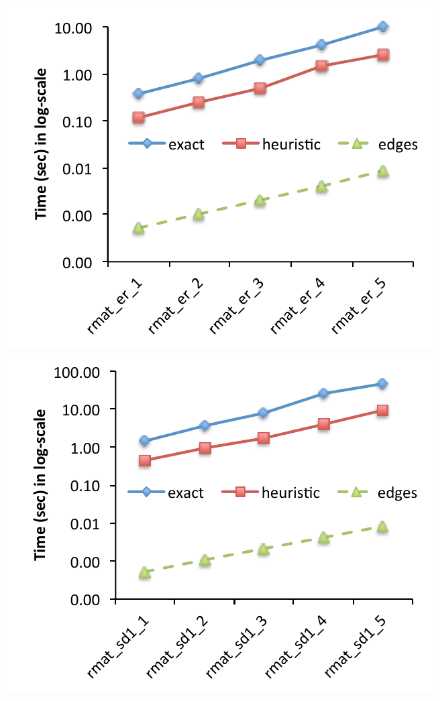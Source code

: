 \begin{figure}
  \centering
    \includegraphics[scale=0.67]{compare_time_er.pdf}
    \includegraphics[scale=0.67]{compare_time_sd1.pdf}\\
    

\end{figure}
